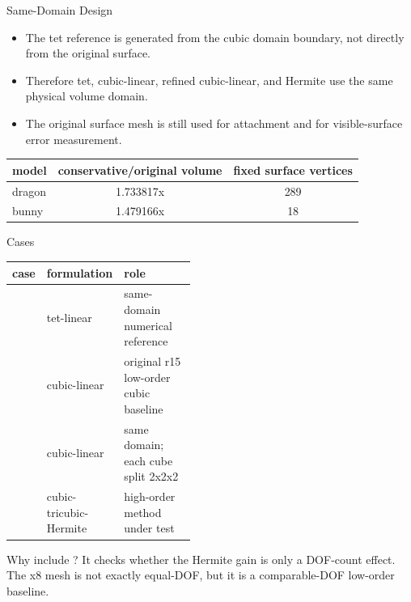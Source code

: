 \documentclass[aspectratio=169,10pt]{beamer}
\newcommand{\case}[1]{\texttt{\detokenize{#1}}}
\begin{document}
\begin{frame}{Same-Domain Design}
  \small
  \begin{itemize}
    \item The tet reference is generated from the cubic domain boundary, not directly from the original surface.
    \item Therefore tet, cubic-linear, refined cubic-linear, and Hermite use the same physical volume domain.
    \item The original surface mesh is still used for attachment and for visible-surface error measurement.
  \end{itemize}

  \vspace{0.6em}
  \begin{table}
    \centering
    \begin{tabular}{lcc}
      \toprule
      model & conservative/original volume & fixed surface vertices \\
      \midrule
      dragon & 1.733817x & 289 \\
      bunny & 1.479166x & 18 \\
      \bottomrule
    \end{tabular}
  \end{table}
\end{frame}

\begin{frame}{Cases}
  \small
  \begin{table}
    \centering
    \begin{tabular}{llp{0.45\linewidth}}
      \toprule
      \normalfont case & formulation & role \\
      \midrule
      \case{tet_ref} & tet-linear & same-domain numerical reference \\
      \case{cubic_linear} & cubic-linear & original r15 low-order cubic baseline \\
      \case{cubic_linear_x8} & cubic-linear & same domain; each cube split 2x2x2 \\
      \case{cubic_hermite} & cubic-tricubic-Hermite & high-order method under test \\
      \bottomrule
    \end{tabular}
  \end{table}

  \vspace{0.5em}
  \begin{block}{Why include \case{cubic_linear_x8}?}
    It checks whether the Hermite gain is only a DOF-count effect. The x8 mesh is not exactly equal-DOF, but it is a comparable-DOF low-order baseline.
  \end{block}
\end{frame}
\end{document}
